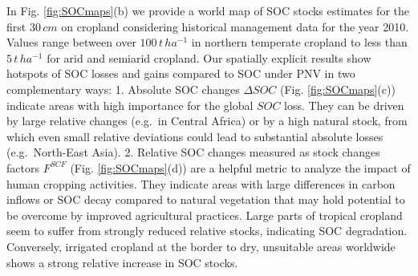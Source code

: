\documentclass[gc, manuscript]{copernicus}
\begin{document}
In Fig. \ref{fig:SOCmaps}(b) we provide a world map of SOC stocks estimates for the first \(30\,\unit{cm}\) on cropland considering historical management data for the year 2010. Values range between over \(100\,\unit{t\,ha^{-1}}\) in northern temperate cropland to less than \(5\,\unit{t\,ha^{-1}}\) for arid and semiarid cropland.
Our spatially explicit results show hotspots of SOC losses and gains compared to SOC under PNV in two complementary ways:
1. Absolute SOC changes \(\Delta SOC\) (Fig. \ref{fig:SOCmaps}(c)) indicate areas with high importance for the global \(SOC\) loss. They can be driven by large relative changes (e.g.~in Central Africa) or by a high natural stock, from which even small relative deviations could lead to substantial absolute losses (e.g.~North-East Asia).
2. Relative SOC changes measured as stock changes factors \(F^{SCF}\) (Fig. \ref{fig:SOCmaps}(d)) are a helpful metric to analyze the impact of human cropping activities. They indicate areas with large differences in carbon inflows or SOC decay compared to natural vegetation that may hold potential to be overcome by improved agricultural practices. Large parts of tropical cropland seem to suffer from strongly reduced relative stocks, indicating SOC degradation. Conversely, irrigated cropland at the border to dry, unsuitable areas worldwide shows a strong relative increase in SOC stocks.
\end{document}
